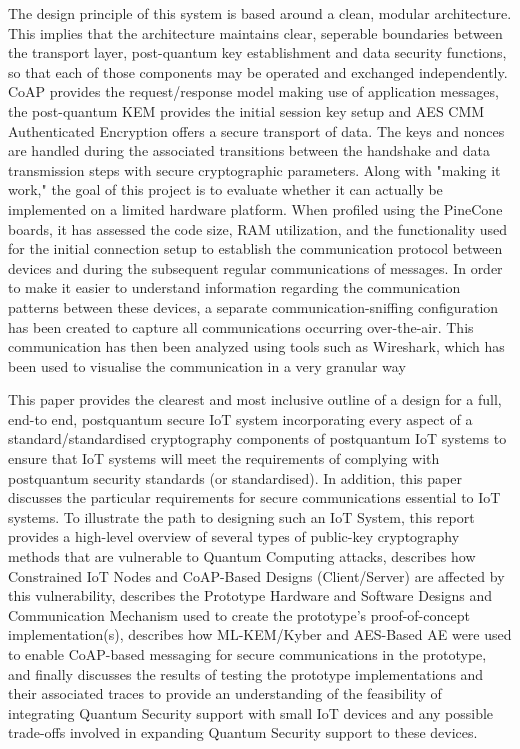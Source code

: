 \documentclass[USenglish,oneside,twocolumn]{article}
\begin{document}
    The design principle of this system is based around a clean, modular architecture. This implies that the architecture maintains clear, seperable boundaries between the transport layer, post-quantum key establishment and data security functions, so that each of those components may be operated and exchanged independently. CoAP provides the request/response model making use of application messages, the post-quantum KEM provides the initial session key setup and AES CMM Authenticated Encryption offers a secure transport of data. The keys and nonces are handled during the associated transitions between the handshake and data transmission steps with secure cryptographic parameters. Along with "making it work," the goal of this project is to evaluate whether it can actually be implemented on a limited hardware platform. When profiled using the PineCone boards, it has assessed the code size, RAM utilization, and the functionality used for the initial connection setup to establish the communication protocol between devices and during the subsequent regular communications of messages. In order to make it easier to understand information regarding the communication patterns between these devices, a separate communication-sniffing configuration has been created to capture all communications occurring over-the-air. This communication has then been analyzed using tools such as Wireshark, which has been used to visualise the communication in a very granular way
    
    This paper provides the clearest and most inclusive outline of a design for a full, end-to end, postquantum secure IoT system incorporating every aspect of a standard/standardised cryptography components of postquantum IoT systems to ensure that IoT systems will meet the requirements of complying with postquantum security standards (or standardised). In addition, this paper discusses the particular requirements for secure communications essential to IoT systems. To illustrate the path to designing such an IoT System, this report provides a high-level overview of several types of public-key cryptography methods that are vulnerable to Quantum Computing attacks, describes how Constrained IoT Nodes and CoAP-Based Designs (Client/Server) are affected by this vulnerability, describes the Prototype Hardware and Software Designs and Communication Mechanism used to create the prototype's proof-of-concept implementation(s), describes how ML-KEM/Kyber and AES-Based AE were used to enable CoAP-based messaging for secure communications in the prototype, and finally discusses the results of testing the prototype implementations and their associated traces to provide an understanding of the feasibility of integrating Quantum Security support with small IoT devices and any possible trade-offs involved in expanding Quantum Security support to these devices.
	\label{sec:intro}
	
\end{document}
